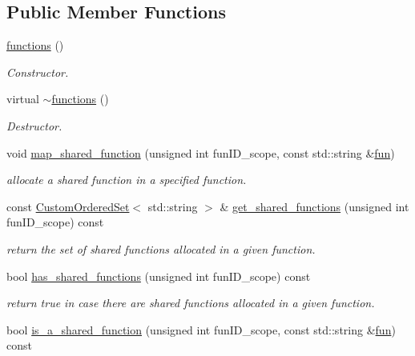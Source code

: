\subsection*{Public Member Functions}
\begin{DoxyCompactItemize}
\item 
\hyperlink{classfunctions_a5c36bb558cc8d3f9ed8999ad964d9b9b}{functions} ()
\begin{DoxyCompactList}\small\item\em Constructor. \end{DoxyCompactList}\item 
virtual \hyperlink{classfunctions_a046bf80312de8e979e3e46a581360e4c}{$\sim$functions} ()
\begin{DoxyCompactList}\small\item\em Destructor. \end{DoxyCompactList}\item 
void \hyperlink{classfunctions_aa00c291ca69a502b86be3e3cfda701fc}{map\+\_\+shared\+\_\+function} (unsigned int fun\+I\+D\+\_\+scope, const std\+::string \&\hyperlink{tutorial__pact__2019_2Introduction_2fourth_2module_8c_a0a2db8044a7b4ea68582e434d4f4692c}{fun})
\begin{DoxyCompactList}\small\item\em allocate a shared function in a specified function. \end{DoxyCompactList}\item 
const \hyperlink{classCustomOrderedSet}{Custom\+Ordered\+Set}$<$ std\+::string $>$ \& \hyperlink{classfunctions_ab435b6f8df7ea1ddeabd35a2d73e7242}{get\+\_\+shared\+\_\+functions} (unsigned int fun\+I\+D\+\_\+scope) const
\begin{DoxyCompactList}\small\item\em return the set of shared functions allocated in a given function. \end{DoxyCompactList}\item 
bool \hyperlink{classfunctions_ae65e0b90457b7af2ed1af8f093797e64}{has\+\_\+shared\+\_\+functions} (unsigned int fun\+I\+D\+\_\+scope) const
\begin{DoxyCompactList}\small\item\em return true in case there are shared functions allocated in a given function. \end{DoxyCompactList}\item 
bool \hyperlink{classfunctions_a931331a26c67b312ee68dce38648046f}{is\+\_\+a\+\_\+shared\+\_\+function} (unsigned int fun\+I\+D\+\_\+scope, const std\+::string \&\hyperlink{tutorial__pact__2019_2Introduction_2fourth_2module_8c_a0a2db8044a7b4ea68582e434d4f4692c}{fun}) const

\end{DoxyCompactItemize}
